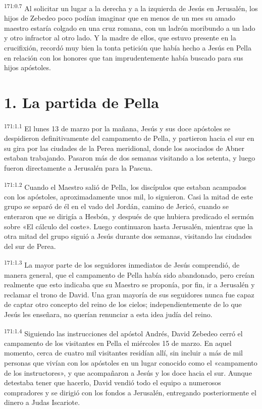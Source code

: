 \par
\textsuperscript{171:0.7} Al solicitar un lugar a la derecha y a la izquierda de Jesús en Jerusalén, los hijos de Zebedeo poco podían imaginar que en menos de un mes su amado maestro estaría colgado en una cruz romana, con un ladrón moribundo a un lado y otro infractor al otro lado. Y la madre de ellos, que estuvo presente en la crucifixión, recordó muy bien la tonta petición que había hecho a Jesús en Pella en relación con los honores que tan imprudentemente había buscado para sus hijos apóstoles.

\section*{1. La partida de Pella}
\par
\textsuperscript{171:1.1} El lunes 13 de marzo por la mañana, Jesús y sus doce apóstoles se despidieron definitivamente del campamento de Pella, y partieron hacia el sur en su gira por las ciudades de la Perea meridional, donde los asociados de Abner estaban trabajando. Pasaron más de dos semanas visitando a los setenta, y luego fueron directamente a Jerusalén para la Pascua.

\par
\textsuperscript{171:1.2} Cuando el Maestro salió de Pella, los discípulos que estaban acampados con los apóstoles, aproximadamente unos mil, lo siguieron. Casi la mitad de este grupo se separó de él en el vado del Jordán, camino de Jericó, cuando se enteraron que se dirigía a Hesbón, y después de que hubiera predicado el sermón sobre «El cálculo del coste». Luego continuaron hasta Jerusalén, mientras que la otra mitad del grupo siguió a Jesús durante dos semanas, visitando las ciudades del sur de Perea.

\par
\textsuperscript{171:1.3} La mayor parte de los seguidores inmediatos de Jesús comprendió, de manera general, que el campamento de Pella había sido abandonado, pero creían realmente que esto indicaba que su Maestro se proponía, por fin, ir a Jerusalén y reclamar el trono de David. Una gran mayoría de sus seguidores nunca fue capaz de captar otro concepto del reino de los cielos; independientemente de lo que Jesús les enseñara, no querían renunciar a esta idea judía del reino.

\par
\textsuperscript{171:1.4} Siguiendo las instrucciones del apóstol Andrés, David Zebedeo cerró el campamento de los visitantes en Pella el miércoles 15 de marzo. En aquel momento, cerca de cuatro mil visitantes residían allí, sin incluir a más de mil personas que vivían con los apóstoles en un lugar conocido como el «campamento de los instructores», y que acompañaron a Jesús y los doce hacia el sur. Aunque detestaba tener que hacerlo, David vendió todo el equipo a numerosos compradores y se dirigió con los fondos a Jerusalén, entregando posteriormente el dinero a Judas Iscariote.

